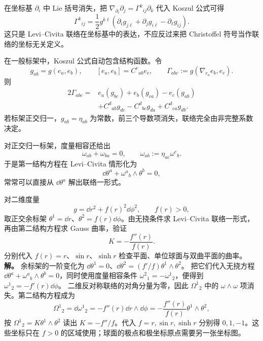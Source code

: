 在坐标基 $\partial_i$ 中 Lie 括号消失，把
$\nabla_{\partial_i}\partial_j=\Gamma^k{}_{ij}\partial_k$ 代入 Koszul 公式可得
\begin{equation*}{
\Gamma^k{}_{ij}
=\frac12g^{k\ell}
\left(
\partial_i g_{j\ell}
+\partial_j g_{i\ell}
-\partial_\ell g_{ij}
\right).}
\end{equation*}
这只是 Levi--Civita 联络在坐标基中的表达，不应反过来把 Christoffel 符号当作联络的坐标无关定义。

在一般标架中，Koszul 公式自动包含结构函数。令
\[
g_{ab}=g(e_a,e_b),
\qquad
[e_a,e_b]=C^c{}_{ab}e_c,
\qquad
\Gamma_{abc}:=g(\nabla_{e_a}e_b,e_c).
\]
则
\begin{equation*}\begin{aligned}
2\Gamma_{abc}
={}&e_a(g_{bc})+e_b(g_{ca})-e_c(g_{ab})\\
&+C^d{}_{ab}g_{dc}-C^d{}_{bc}g_{da}+C^d{}_{ca}g_{db}.
\end{aligned}
\end{equation*}
若标架正交归一，$g_{ab}=\eta_{ab}$ 为常数，前三个导数项消失，联络完全由非完整系数决定。

对正交归一标架，度量相容还给出
\begin{equation}\label{eq:math-dg-orthonormal-connection-skew}
\omega_{ab}+\omega_{ba}=0,
\qquad
\omega_{ab}:=\eta_{ac}\omega^c{}_b.
\end{equation}
于是第一结构方程在 Levi--Civita 情形化为
\[
\dd\theta^a+\omega^a{}_b\wedge\theta^b=0,
\]
常常可以直接从 $\dd\theta^a$ 解出联络一形式。


\par
\begin{workedexample}[旋转对称曲面的联络与曲率]
对二维度量
\[
g=\dd r^2+f(r)^2\dd\phi^2,
\qquad f(r)>0,
\]
取正交余标架 \(\theta^1=\dd r\)、\(\theta^2=f(r)\dd\phi\)。由无挠条件求 Levi--Civita 联络一形式，再由第二结构方程求 Gauss 曲率，验证
\[
K=-\frac{f''(r)}{f(r)}.
\]
分别代入 \(f(r)=r\)、\(\sin r\)、\(\sinh r\) 检查平面、单位球面与双曲平面的曲率。
\textbf{解。} 余标架的一阶变化为 \(\dd\theta^1=0\)、\(\dd\theta^2=(f'/f)\theta^1\wedge\theta^2\)。
把它们代入无挠方程 \(\dd\theta^a+\omega^a{}_b\wedge\theta^b=0\)，同时使用度量相容条件 \(\omega^2{}_1=-\omega^1{}_2\)，便得到 \(\omega^1{}_2=-f'(r)\dd\phi\)。
二维反对称联络的对角分量为零，因此 \(\Omega^1{}_2\) 中的 \(\omega\wedge\omega\) 项消失。第二结构方程成为
\[
\Omega^1{}_2=\dd\omega^1{}_2=-f''(r)\dd r\wedge\dd\phi
=-\frac{f''(r)}{f(r)}\theta^1\wedge\theta^2,
\]
按 \(\Omega^1{}_2=K\theta^1\wedge\theta^2\) 读出 \(K=-f''/f\)。代入 \(f=r,\sin r,\sinh r\) 分别得 \(0,1,-1\)。这些坐标只在 \(f>0\) 的区域使用；球面的极点和极坐标原点需要另一张坐标图。
\end{workedexample}
\par

